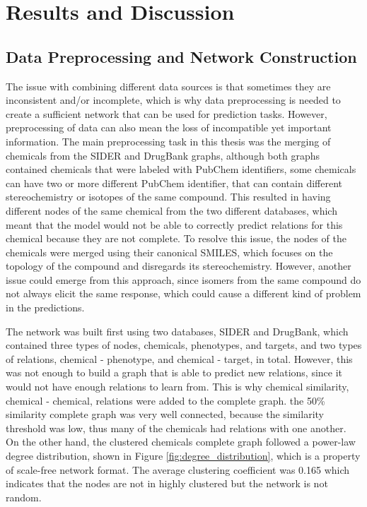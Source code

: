 \chapter{Results and Discussion}
\label{results}

\section{Data Preprocessing and Network Construction}
The issue with combining different data sources is that sometimes they are inconsistent and/or incomplete, which is why data preprocessing is needed to create a sufficient network that can be used for prediction tasks. However, preprocessing of data can also mean the loss of incompatible yet important information. The main preprocessing task in this thesis was the merging of chemicals from the \ac{SIDER} and DrugBank graphs, although both graphs contained chemicals that were labeled with PubChem identifiers, some chemicals can have two or more different PubChem identifier, that can contain different stereochemistry or isotopes of the same compound. This resulted in having different nodes of the same chemical from the two different databases, which meant that the model would not be able to correctly predict relations for this chemical because they are not complete. To resolve this issue, the nodes of the chemicals were merged using their canonical \ac{SMILES}, which focuses on the topology of the compound and disregards its stereochemistry. However, another issue could emerge from this approach, since isomers from the same compound do not always elicit the same response, which could cause a different kind of problem in the predictions.

The network was built first using two databases, \ac{SIDER} and DrugBank, which contained three types of nodes, chemicals, phenotypes, and targets, and two types of relations, chemical - phenotype, and chemical - target, in total. However, this was not enough to build a graph that is able to predict new relations, since it would not have enough relations to learn from. This is why chemical similarity, chemical - chemical, relations were added to the complete graph. the 50\% similarity complete graph was very well connected, because the similarity threshold was low, thus many of the chemicals had relations with one another. On the other hand, the clustered chemicals complete graph followed a power-law degree distribution, shown in Figure \ref{fig:degree_distribution}, which is a property of scale-free network format. The average clustering coefficient was 0.165 which indicates that the nodes are not in highly clustered but the network is not random.

